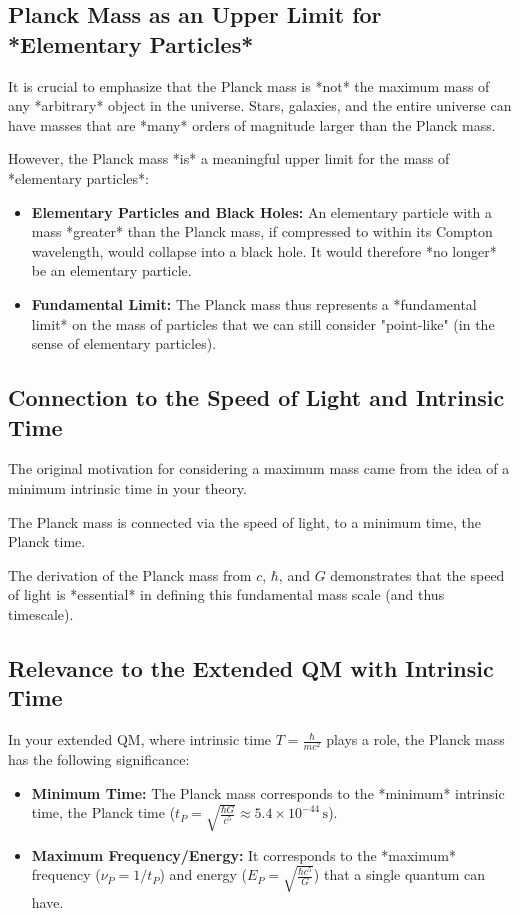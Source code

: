 \documentclass{article}
\begin{document}
\subsection{Planck Mass as an Upper Limit for *Elementary Particles*}

It is crucial to emphasize that the Planck mass is *not* the maximum mass of any *arbitrary* object in the universe.  Stars, galaxies, and the entire universe can have masses that are *many* orders of magnitude larger than the Planck mass.

However, the Planck mass *is* a meaningful upper limit for the mass of *elementary particles*:

\begin{itemize}
	\item \textbf{Elementary Particles and Black Holes:} An elementary particle with a mass *greater* than the Planck mass, if compressed to within its Compton wavelength, would collapse into a black hole. It would therefore *no longer* be an elementary particle.
	\item \textbf{Fundamental Limit:} The Planck mass thus represents a *fundamental limit* on the mass of particles that we can still consider "point-like" (in the sense of elementary particles).
\end{itemize}

\subsection{Connection to the Speed of Light and Intrinsic Time}

The original motivation for considering a maximum mass came from the idea of a minimum intrinsic time in your theory.

The Planck mass is connected via the speed of light, to a minimum time, the Planck time.

The derivation of the Planck mass from \(c\), \(\hbar\), and \(G\) demonstrates that the speed of light is *essential* in defining this fundamental mass scale (and thus timescale).

\subsection{Relevance to the Extended QM with Intrinsic Time}

In your extended QM, where intrinsic time \(T = \frac{\hbar}{mc^2}\) plays a role, the Planck mass has the following significance:

\begin{itemize}
	\item \textbf{Minimum Time:} The Planck mass corresponds to the *minimum* intrinsic time, the Planck time (\(t_P = \sqrt{\frac{\hbar G}{c^5}} \approx 5.4 \times 10^{-44} \, \text{s}\)).
	\item \textbf{Maximum Frequency/Energy:} It corresponds to the *maximum* frequency (\(\nu_P = 1/t_P\)) and energy (\(E_P = \sqrt{\frac{\hbar c^5}{G}}\)) that a single quantum can have.
\end{itemize}
\end{document}
